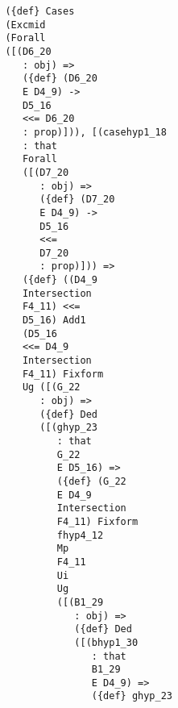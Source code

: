 \documentclass[12pt]{article}
\begin{document}
\begin{verbatim}
                                  ({def} Cases 
                                  (Excmid 
                                  (Forall 
                                  ([(D6_20 
                                     : obj) => 
                                     ({def} (D6_20 
                                     E D4_9) -> 
                                     D5_16 
                                     <<= D6_20 
                                     : prop)])), [(casehyp1_18 
                                     : that 
                                     Forall 
                                     ([(D7_20 
                                        : obj) => 
                                        ({def} (D7_20 
                                        E D4_9) -> 
                                        D5_16 
                                        <<= 
                                        D7_20 
                                        : prop)])) => 
                                     ({def} ((D4_9 
                                     Intersection 
                                     F4_11) <<= 
                                     D5_16) Add1 
                                     (D5_16 
                                     <<= D4_9 
                                     Intersection 
                                     F4_11) Fixform 
                                     Ug ([(G_22 
                                        : obj) => 
                                        ({def} Ded 
                                        ([(ghyp_23 
                                           : that 
                                           G_22 
                                           E D5_16) => 
                                           ({def} (G_22 
                                           E D4_9 
                                           Intersection 
                                           F4_11) Fixform 
                                           fhyp4_12 
                                           Mp 
                                           F4_11 
                                           Ui 
                                           Ug 
                                           ([(B1_29 
                                              : obj) => 
                                              ({def} Ded 
                                              ([(bhyp1_30 
                                                 : that 
                                                 B1_29 
                                                 E D4_9) => 
                                                 ({def} ghyp_23 

\end{verbatim}
\end{document}
